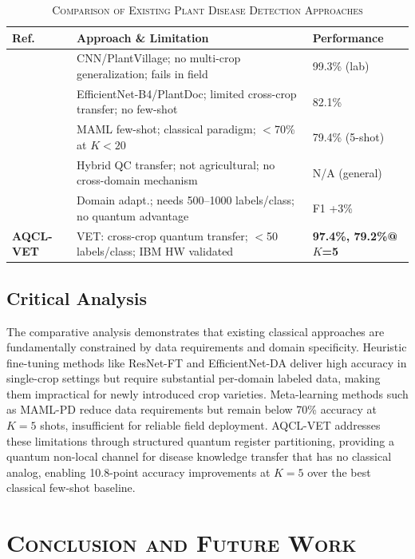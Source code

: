 \documentclass[conference]{IEEEtran}
\begin{document}
\begin{table}[htbp]
\caption{\textsc{Comparison of Existing Plant Disease Detection Approaches}}
\label{tab:comparison}
\centering
\begin{tabular}{p{0.5cm}p{4.5cm}p{2.3cm}}
\toprule
\textbf{Ref.} & \textbf{Approach \& Limitation} & \textbf{Performance} \\
\midrule
\cite{mohanty2016} & CNN/PlantVillage; no multi-crop generalization; fails in field & 99.3\% (lab) \\
\cite{thapa2022}   & EfficientNet-B4/PlantDoc; limited cross-crop transfer; no few-shot & 82.1\% \\
\cite{gao2023}     & MAML few-shot; classical paradigm; $<$70\% at $K < 20$ & 79.4\% (5-shot) \\
\cite{mari2020}    & Hybrid QC transfer; not agricultural; no cross-domain mechanism & N/A (general) \\
\cite{lu2022}      & Domain adapt.; needs 500--1000 labels/class; no quantum advantage & F1 +3\% \\
\midrule
\textbf{AQCL-VET} & VET: cross-crop quantum transfer; $<$50 labels/class; IBM HW validated & \textbf{97.4\%, 79.2\%@$K$=5} \\
\bottomrule
\end{tabular}
\end{table}

\subsection{Critical Analysis}

The comparative analysis demonstrates that existing classical approaches are fundamentally constrained by data requirements and domain specificity. Heuristic fine-tuning methods like ResNet-FT and EfficientNet-DA deliver high accuracy in single-crop settings but require substantial per-domain labeled data, making them impractical for newly introduced crop varieties. Meta-learning methods such as MAML-PD reduce data requirements but remain below 70\% accuracy at $K = 5$ shots, insufficient for reliable field deployment. AQCL-VET addresses these limitations through structured quantum register partitioning, providing a quantum non-local channel for disease knowledge transfer that has no classical analog, enabling 10.8-point accuracy improvements at $K = 5$ over the best classical few-shot baseline.

\section{\textsc{Conclusion and Future Work}}
\label{sec:conclusion}
\end{document}

